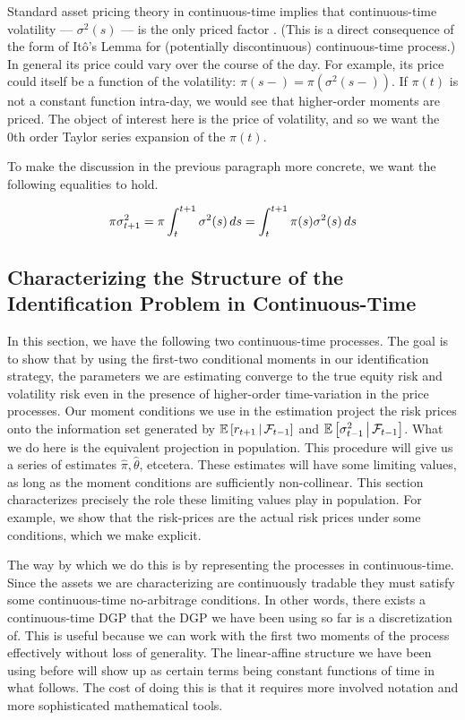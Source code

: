 \documentclass[11pt, letterpaper, twoside, final]{article}
\begin{document}
Standard asset pricing theory in continuous-time implies that continuous-time volatility --- $\sigma^2(s)$ ---
is the only priced factor \parencites{merton1973intertemporal, tsai2018pricing, sangrey2018jumps}. 
(This is a direct consequence of the form of It\^{o}'s Lemma for (potentially discontinuous) continuous-time
process.)
In general its price could vary over the course of the day.
For example, its price could  itself be a function of the volatility: $\pi(s-) = \pi(\sigma^2(s-))$.
If $\pi(t)$ is not a constant function intra-day, we would see that higher-order moments are priced.
The object of interest here is the price of volatility, and so we want the 0th order Taylor series expansion of
the $\pi(t)$.

To make the discussion in the previous paragraph more concrete, we want the following equalities to hold. 

\begin{equation}
    \pi \sigma^2_{t+1} = \pi \int_{t}^{t+1} \sigma^2(s) \mathop{}\!d s =  \int_{t}^{t+1} \pi(s) \sigma^2(s) \mathop{}\!d s
\end{equation}



\subsection{Characterizing the Structure of the Identification Problem in Continuous-Time}

In this section, we have the following two continuous-time processes.
The goal is to show that by using the first-two conditional moments in our identification strategy, the parameters
we are estimating converge to the true equity risk and volatility risk even in the presence of higher-order
time-variation in the price processes.
Our moment conditions we use in the estimation project the risk prices onto the information set generated by
$\operatorname{\mathbb{E}}\left[r_{t+1}\,\middle\vert\, \mathcal{F}_{t-1}\right]$  and $\operatorname{\mathbb{E}}\left[\sigma^2_{t-1} \,\middle\vert\, \mathcal{F}_{t-1}\right]$.
What we do here is the equivalent projection in population.
This procedure will give us a series of estimates $\hat{\pi}, \hat{\theta}$, etcetera.
These estimates will have some limiting values, as long as the moment conditions are sufficiently non-collinear.
This section characterizes precisely the role these limiting values play in population.
For example, we show that the risk-prices are the actual risk prices under some conditions, which we make
explicit.

The way by which we do this is by representing the processes in continuous-time.
Since the assets we are characterizing are continuously tradable they must satisfy some continuous-time
no-arbitrage conditions. 
In other words, there exists a continuous-time DGP that the DGP we have been using so far is a discretization of. 
This is useful because we can work with the first two moments of the process effectively without loss of
generality.
The linear-affine structure we have been using before will show up as certain terms being constant functions of
time in what follows.
The cost of doing this is that it requires more involved notation and more sophisticated mathematical tools.
\end{document}
